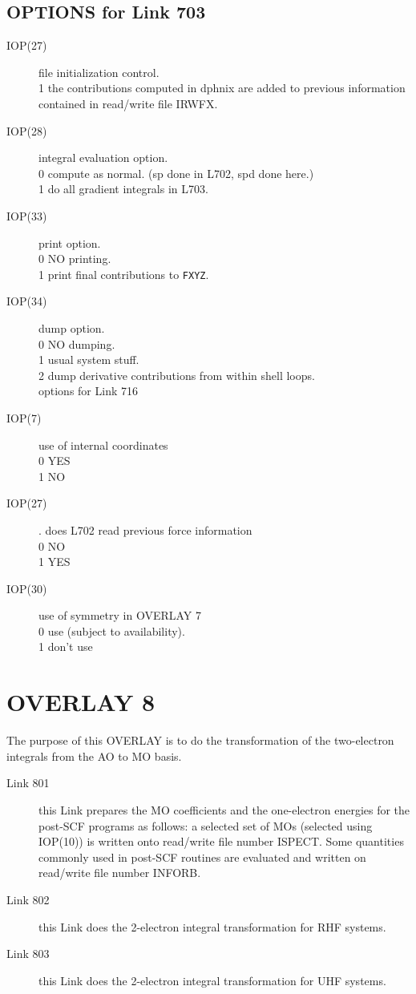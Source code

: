 \subsection{\sf OPTIONS for Link 703}
\begin{description}
\item[IOP(27)]  file initialization control. \\
1  the contributions computed in dphnix are added 
to previous information contained in read/write file IRWFX.  \\
\item[IOP(28)]  integral evaluation option.  \\
0  compute as normal. (sp done in L702, spd done here.) \\
1  do all gradient integrals in L703. \\
\item[IOP(33)]  print option.  \\
0  NO printing. \\
1  print final contributions to {\tt FXYZ}. \\
\item[IOP(34)]  dump option.  \\
0  NO dumping. \\
1  usual system stuff. \\
2  dump derivative contributions from within shell loops. \\
options for Link 716
\item[IOP(7)] use of internal coordinates  \\
0  YES \\
1  NO \\
\item[IOP(27)]. does L702 read previous force information  \\
0  NO \\
1  YES \\
\item[IOP(30)]  use of symmetry in OVERLAY 7  \\
0  use (subject to availability). \\
1  don't use \\
\end{description}
\section{\sf OVERLAY 8}
The purpose of this OVERLAY is to do the transformation of the
two-electron integrals from the AO to MO basis. 
\begin{description}
\item[Link 801]  this Link prepares the MO coefficients and the one-electron
energies for the post-SCF programs as follows:  a selected set of
MOs (selected using IOP(10)) is written onto read/write file number
ISPECT.  Some
quantities commonly used in post-SCF routines are evaluated and
written on read/write file number INFORB.
\item[Link 802]  this Link does the 2-electron integral transformation for
RHF systems.
\item[Link 803]  this Link does the 2-electron integral transformation for
UHF systems.
\end{description}

